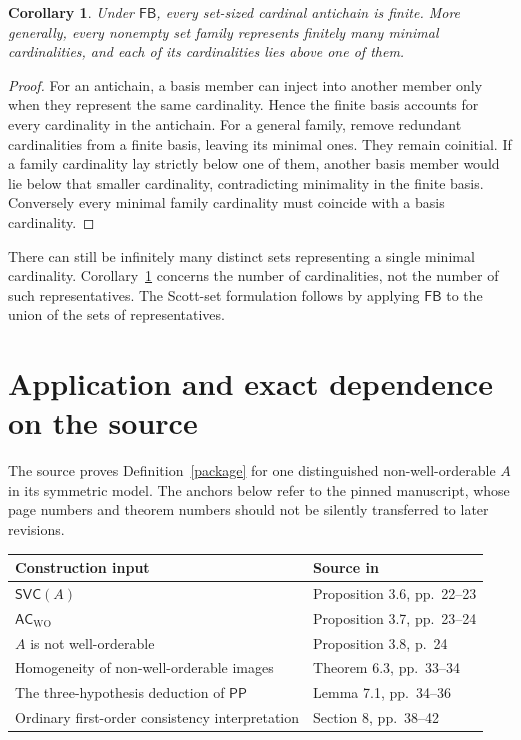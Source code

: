 \documentclass[11pt,a4paper]{article}
\newcommand{\ACWO}{\mathsf{AC}_{\mathrm{WO}}}
\newcommand{\PP}{\mathsf{PP}}
\newcommand{\FB}{\mathsf{FB}}
\newcommand{\SVC}{\mathsf{SVC}}
\newtheorem{corollary}[theorem]{Corollary}
\theoremstyle{definition}
\theoremstyle{remark}
\begin{document}
\begin{corollary}\label{antichain}
Under $\FB$, every set-sized cardinal antichain is finite. More generally, every nonempty set family represents finitely many minimal cardinalities, and each of its cardinalities lies above one of them.
\end{corollary}
\begin{proof}
For an antichain, a basis member can inject into another member only when they represent the same cardinality. Hence the finite basis accounts for every cardinality in the antichain. For a general family, remove redundant cardinalities from a finite basis, leaving its minimal ones. They remain coinitial. If a family cardinality lay strictly below one of them, another basis member would lie below that smaller cardinality, contradicting minimality in the finite basis. Conversely every minimal family cardinality must coincide with a basis cardinality.
\end{proof}

There can still be infinitely many distinct sets representing a single minimal cardinality. Corollary~\ref{antichain} concerns the number of cardinalities, not the number of such representatives. The Scott-set formulation follows by applying $\FB$ to the union of the sets of representatives.

\section{Application and exact dependence on the source}\label{application}

The source proves Definition~\ref{package} for one distinguished non-well-orderable $A$ in its symmetric model. The anchors below refer to the pinned manuscript, whose page numbers and theorem numbers should not be silently transferred to later revisions.

\begin{center}\small
\begin{tabular}{p{.48\linewidth}p{.42\linewidth}}
\toprule
Construction input & Source in \cite{OpenAI}\\
\midrule
$\SVC(A)$ & Proposition 3.6, pp.~22--23\\
$\ACWO$ & Proposition 3.7, pp.~23--24\\
$A$ is not well-orderable & Proposition 3.8, p.~24\\
Homogeneity of non-well-orderable images & Theorem 6.3, pp.~33--34\\
The three-hypothesis deduction of $\PP$ & Lemma 7.1, pp.~34--36\\
Ordinary first-order consistency interpretation & Section 8, pp.~38--42\\
\bottomrule
\end{tabular}
\end{center}
\end{document}
